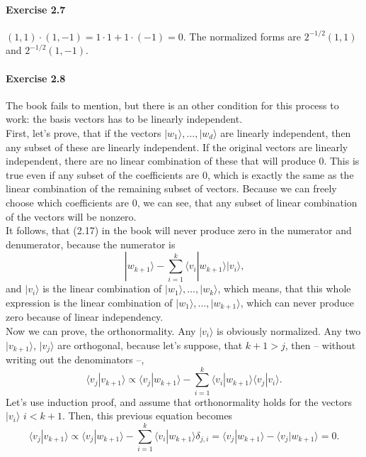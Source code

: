 \documentclass[a4paper,12pt]{article}
\newcommand{\exercise}[1]{\paragraph{Exercise #1}}
\newcommand{\la}{\langle}
\newcommand{\ra}{\rangle}
\begin{document}
    \exercise{2.7} $(1, 1) \cdot (1, -1) = 1 \cdot 1 + 1 \cdot (-1) = 0$. The normalized forms are $2^{-1/2} (1, 1)$ and $2^{-1/2} (1, -1)$.

    \exercise{2.8} The book fails to mention, but there is an other condition for this process to work: the basis vectors has to be linearly independent.\\
    \indent
    First, let's prove, that if the vectors $|w_1\ra, \ldots, |w_d\ra$ are linearly independent, then any subset of these are linearly independent. If the original vectors are linearly independent, there are no linear combination of these that will produce 0. This is true even if any subset of the coefficients are 0, which is exactly the same as the linear combination of the remaining subset of vectors. Because we can freely choose which coefficients are 0, we can see, that any subset of linear combination of the vectors will be nonzero.\\
    \indent
    It follows, that (2.17) in the book will never produce zero in the numerator and denumerator, because the numerator is
    \begin{equation}
        | w_{k+1} \ra - \sum_{i = 1}^k \la v_i | w_{k+1} \ra | v_i \ra \textrm{,}
    \end{equation}
    and $|v_i\ra$ is the linear combination of $|w_1\ra, \ldots, |w_k\ra$, which means, that this whole expression is the linear combination of $|w_1\ra, \ldots, |w_{k+1}\ra$, which can never produce zero because of linear independency.\\
    \indent
    Now we can prove, the orthonormality. Any $|v_i\ra$ is obviously normalized. Any two $|v_{k+1}\ra$, $|v_j\ra$ are orthogonal, because let's suppose, that $k+1 > j$, then -- without writing out the denominators --,
    \begin{equation}
        \la v_j | v_{k+1} \ra \propto \la v_j | w_{k+1} \ra - \sum_{i=1}^k \la v_i | w_{k+1} \ra \la v_j | v_i \ra \textrm{.}
    \end{equation}
    Let's use induction proof, and assume that orthonormality holds for the vectors $|v_i\ra$ $i < k+1$. Then, this previous equation becomes
    \begin{equation}
        \la v_j | v_{k+1} \ra \propto \la v_j | w_{k+1} \ra - \sum_{i=1}^k \la v_i | w_{k+1} \ra \delta_{j, i} = \la v_j | w_{k+1} \ra - \la v_j | w_{k+1} \ra = 0 \textrm{.}
    \end{equation}
\end{document}
